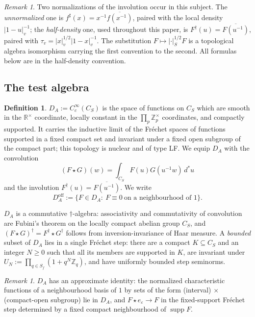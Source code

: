 \documentclass[11pt]{amsart}
\theoremstyle{definition}
\newtheorem{definition}[theorem]{Definition}
\theoremstyle{remark}
\newtheorem{remark}[theorem]{Remark}
\newcommand{\R}{\mathbb R}
\newcommand{\Z}{\mathbb Z}
\newcommand{\dstar}{\,d^{*}}
\newcommand{\supp}{\operatorname{supp}}
\newcommand{\DA}{D_A}
\begin{document}
\begin{remark}\label{rem:normdict}
Two normalizations of the involution occur in this subject.  The
\emph{unnormalized} one is $f^{\sharp}(x)=x^{-1}\overline{f(x^{-1})}$, paired
with the local density $|1-u|_v^{-1}$; the \emph{half-density} one, used
throughout this paper, is $F^{\dagger}(u)=\overline{F(u^{-1})}$, paired with
$\tau_v=|x|_v^{1/2}|1-x|_v^{-1}$.  The substitution
$F\mapsto|\cdot|_S^{1/2}F$ is a topological algebra isomorphism carrying the
first convention to the second.  All formulas below are in the half-density
convention.
\end{remark}

\subsection{The test algebra}

\begin{definition}\label{def:DA}
$\DA:=C_c^{\infty}(C_S)$ is the space of functions on $C_S$ which are smooth
in the $\R^{\times}$ coordinate, locally constant in the
$\prod_p\Z_p^{\times}$ coordinates, and compactly supported.  It carries the
inductive limit of the Fr\'echet spaces of functions supported in a fixed
compact set and invariant under a fixed open subgroup of the compact part; this
topology is nuclear and of type LF.  We equip $\DA$ with the convolution
\[
(F\star G)(w)=\int_{C_S}F(u)G(u^{-1}w)\dstar u
\]
and the involution $F^{\dagger}(u)=\overline{F(u^{-1})}$.  We write
\[
\DA^{\mathrm{off}}:=\{F\in\DA:\ F\equiv0\ \text{on a neighbourhood of }1\}.
\]
\end{definition}

$\DA$ is a commutative $\dagger$-algebra: associativity and commutativity of
convolution are Fubini's theorem on the locally compact abelian group $C_S$,
and $(F\star G)^{\dagger}=F^{\dagger}\star G^{\dagger}$ follows from
inversion-invariance of Haar measure.  A \emph{bounded} subset of $\DA$ lies in
a single Fr\'echet step: there are a compact $K\subseteq C_S$ and an integer
$N\ge0$ such that all its members are supported in $K$, are invariant under
$U_N:=\prod_{q\in S_f}(1+q^{N}\Z_q)$, and have uniformly bounded step
seminorms.

\begin{remark}\label{rem:approxid}
$\DA$ has an approximate identity: the normalized characteristic functions of
a neighbourhood basis of $1$ by sets of the form (interval) $\times$
(compact-open subgroup) lie in $\DA$, and $F\star e_{\varepsilon}\to F$ in the
fixed-support Fr\'echet step determined by a fixed compact neighbourhood of
$\supp F$.
\end{remark}
\end{document}
